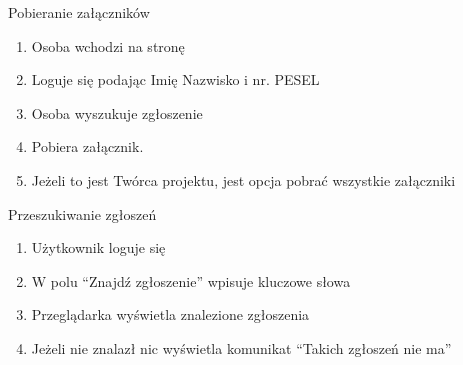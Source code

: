 \begin{usecase}{Pobieranie załączników}
	\begin{enumerate}
    \item Osoba wchodzi na stronę
    \item Loguje się podając Imię Nazwisko i nr. PESEL
    \item Osoba wyszukuje zgłoszenie
    \item Pobiera załącznik.
    \item Jeżeli to jest Twórca projektu, jest opcja pobrać wszystkie załączniki
	\end{enumerate}
\end{usecase}

\begin{usecase}{Przeszukiwanie zgłoszeń}
	\begin{enumerate}
    \item Użytkownik loguje się
    \item W polu “Znajdź zgłoszenie” wpisuje kluczowe słowa
    \item Przeglądarka wyświetla znalezione zgłoszenia
    \item Jeżeli nie znalazł nic wyświetla komunikat “Takich zgłoszeń nie ma”
	\end{enumerate}
\end{usecase}

